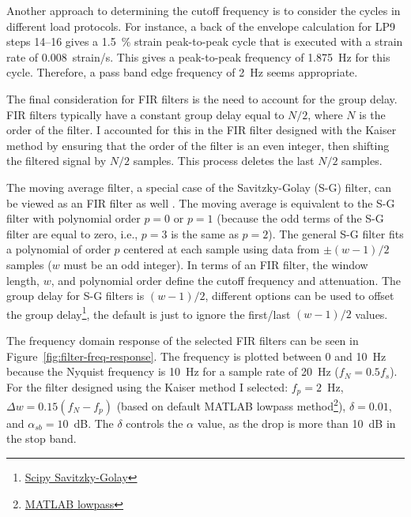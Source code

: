 \documentclass[a4paper,11pt]{article}
\begin{document}
Another approach to determining the cutoff frequency is to consider the cycles in different load protocols.
For instance, a back of the envelope calculation for LP9 steps 14--16 gives a 1.5~\% strain peak-to-peak cycle that is executed with a strain rate of 0.008~strain/s.
This gives a peak-to-peak frequency of 1.875~Hz for this cycle.
Therefore, a pass band edge frequency of 2~Hz seems appropriate.

The final consideration for FIR filters is the need to account for the group delay.
FIR filters typically have a constant group delay equal to $N / 2$, where $N$ is the order of the filter.
I accounted for this in the FIR filter designed with the Kaiser method by ensuring that the order of the filter is an even integer, then shifting the filtered signal by $N/2$ samples.
This process deletes the last $N/2$ samples.

The moving average filter, a special case of the Savitzky-Golay (S-G) filter, can be viewed as an FIR filter as well \citep{SchaferWhatSavitzkyGolayFilter2011}.
The moving average is equivalent to the S-G filter with polynomial order $p = 0$ or $p = 1$ (because the odd terms of the S-G filter are equal to zero, i.e., $p = 3$ is the same as $p = 2$).
The general S-G filter fits a polynomial of order $p$ centered at each sample using data from $\pm(w-1)/2$ samples ($w$ must be an odd integer).
In terms of an FIR filter, the window length, $w$, and polynomial order define the cutoff frequency and attenuation.
The group delay for S-G filters is $(w - 1) / 2$, different options can be used to offset the group delay\footnote{\href{https://docs.scipy.org/doc/scipy/reference/generated/scipy.signal.savgol\_filter.html\#scipy.signal.savgol\_filter}{Scipy Savitzky-Golay}}, the default is just to ignore the first/last $(w - 1) / 2$ values.

The frequency domain response of the selected FIR filters can be seen in Figure~\ref{fig:filter-freq-response}.
The frequency is plotted between 0 and 10~Hz because the Nyquist frequency is 10~Hz for a sample rate of 20~Hz ($f_N = 0.5 f_s$).
For the filter designed using the Kaiser method I selected: $f_{p} = 2$~Hz, $\Delta w = 0.15 (f_N - f_{p})$ (based on default MATLAB lowpass method\footnote{\href{https://ch.mathworks.com/help/signal/ref/lowpass.html}{MATLAB lowpass}}), 
$\delta = 0.01$, and $\alpha_{sb} = 10$~dB.
The $\delta$ controls the $\alpha$ value, as the drop is more than 10~dB in the stop band.
\end{document}
